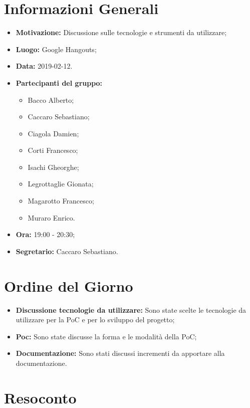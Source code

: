 \documentclass[a4paper, oneside, openany, dvipsnames, table]{article}
\begin{document}
\copertina{}


\newpage
\tableofcontents
\newpage
\section{Informazioni Generali}
\begin{itemize}
\item \textbf{Motivazione:} Discussione sulle tecnologie e strumenti da utilizzare;
\item \textbf{Luogo:} Google Hangouts;
\item \textbf{Data:} 2019-02-12.
\item \textbf{Partecipanti del gruppo:} \hfill
	\begin{itemize}
	\item Bacco Alberto;
	\item Caccaro Sebastiano;
	\item Ciagola Damien;
	\item Corti Francesco;
	\item Isachi Gheorghe;
	\item Legrottaglie Gionata;
	\item Magarotto Francesco;
	\item Muraro Enrico.
	\end{itemize} 
\item \textbf{Ora:} 19:00 - 20:30;
\item \textbf{Segretario:} Caccaro Sebastiano.
\end{itemize}

\section{Ordine del Giorno}
\begin{itemize}
	\item \textbf{Discussione tecnologie da utilizzare:} Sono state scelte le tecnologie da utilizzare per la PoC e per lo sviluppo del progetto;
	\item \textbf{Poc:} Sono state discusse la forma e le modalità della PoC;
	\item \textbf{Documentazione:} Sono stati discussi incrementi da apportare alla documentazione.
\end{itemize}

\section{Resoconto}
\end{document}
